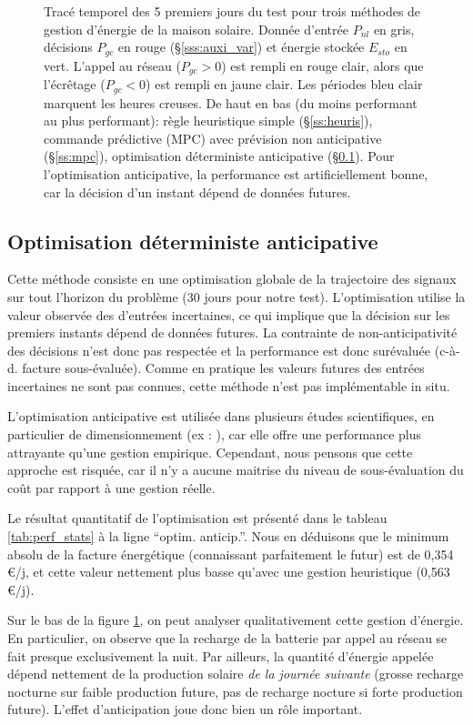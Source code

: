 \documentclass[a4paper,10pt,twocolumn]{article}
\begin{document}
\begin{figure}
  \caption{Tracé temporel des 5 premiers jours du test pour trois méthodes
  de gestion d'énergie de la maison solaire.
  Donnée d'entrée $P_{nl}$ en gris, décisions $P_{gc}$ en rouge (§\ref{sss:auxi_var})
  et énergie stockée $E_{sto}$ en vert.
  L'appel au réseau ($P_{gc}>0$) est rempli en rouge clair,
  alors que l'écrêtage ($P_{gc}<0$) est rempli en jaune clair.
  Les périodes bleu clair marquent les heures creuses.
  De haut en bas (du moins performant au plus performant):
  règle heuristique simple (§\ref{ss:heuris}),
  commande prédictive (MPC) avec prévision non anticipative (§\ref{ss:mpc}),
  optimisation déterministe anticipative (§\ref{ss:anticip}).
  Pour l'optimisation anticipative, la performance est artificiellement bonne,
  car la décision d'un instant dépend de données futures.
  }
  \label{fig:temporel}
\end{figure}

\subsection{Optimisation déterministe anticipative}
\label{ss:anticip}

Cette méthode consiste en une optimisation globale de la trajectoire des signaux
sur tout l'horizon du problème (30 jours pour notre test).
L'optimisation utilise la valeur observée des d'entrées incertaines,
ce qui implique que la décision sur les premiers instants dépend
de données futures.
La contrainte de non-anticipativité des décisions n'est donc pas respectée 
et la performance est donc surévaluée (c-à-d. facture sous-évaluée).
Comme en pratique les valeurs futures des entrées incertaines ne sont pas connues,
cette méthode n'est pas implémentable in situ.

L'optimisation anticipative est utilisée dans plusieurs études scientifiques,
en particulier de dimensionnement (ex : \cite{Rigo-Mariani:2014:SGE}),
car elle offre une performance plus attrayante qu'une gestion empirique.
Cependant, nous pensons que cette approche est risquée, car il n'y a aucune maitrise
du niveau de sous-évaluation du coût par rapport à une gestion réelle.

Le résultat quantitatif de l'optimisation est présenté dans le tableau \ref{tab:perf_stats}
à la ligne ``optim. anticip.''.
Nous en déduisons que le minimum absolu de la facture énergétique 
(connaissant parfaitement le futur) est de 0,354\,€/j,
et cette valeur nettement plus basse qu'avec une gestion heuristique (0,563\,€/j).

Sur le bas de la figure \ref{fig:temporel}, on peut analyser qualitativement
cette gestion d'énergie. En particulier, on observe que la recharge de la batterie
par appel au réseau se fait presque exclusivement la nuit.
Par ailleurs, la quantité d'énergie appelée dépend nettement de la production solaire
\emph{de la journée suivante} (grosse recharge nocturne sur faible production future,
pas de recharge nocture si forte production future).
L'effet d'anticipation joue donc bien un rôle important.
\end{document}
